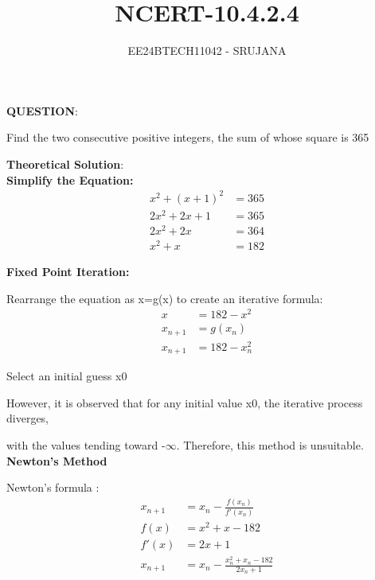 \documentclass[journal]{IEEEtran}
\begin{document}

\vspace{3cm}

\title{NCERT-10.4.2.4}
\author{EE24BTECH11042 - SRUJANA}
{\let\newpage\relax\maketitle}

\renewcommand{\thefigure}{\theenumi}
\renewcommand{\thetable}{\theenumi}
\setlength{\intextsep}{10pt} 

\renewcommand{\thetable}{\theenumi}

\textbf{QUESTION}:

Find the two consecutive positive integers, the sum of whose square is 365

\textbf{Theoretical Solution}:\\

\textbf{Simplify the Equation:}
\begin{align}
  x^2 + (x+1)^2 &= 365\\
  2x^2 + 2x + 1 &= 365\\
  2x^2 + 2x &= 364\\
  x^2 + x &= 182
\end{align}

\textbf{Fixed Point Iteration:}

Rearrange the equation as x=g(x) to create an iterative formula:
\begin{align}
    x &= 182 - x^2\\
    x_{n+1} &= g(x_n)\\
    x_{n+1} &= 182 - x_n^2
\end{align}

Select an initial guess x0

However, it is observed that for any initial value x0, the iterative process diverges, 

with the values tending toward -$\infty$. Therefore, this method is unsuitable.\\

\textbf{Newton's Method}

Newton's formula :
\begin{align}
    x_{n+1} &= x_n - \frac{f(x_n)}{f'(x_n)}\\
    f(x) &= x^2 + x - 182\\
    f'(x) &= 2x + 1\\
    x_{n+1} &= x_n - \frac{x_n^2 + x_n - 182}{2x_n + 1}
\end{align}
\end{document}
